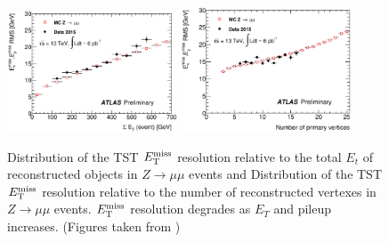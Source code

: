 \begin{figure}[htb]
  \begin{center}
    \includegraphics[width=0.45\textwidth]{figures/METCalib/METReso_Et.eps}\hspace{0.05\textwidth}
    \includegraphics[width=0.45\textwidth]{figures/METCalib/METReso_nVtx.eps}\hspace{0.05\textwidth}
\end{center}
\caption{Distribution of the TST $E_{\mathrm{T}}^{\mathrm{miss}}$ resolution relative to the total $E_t$ of reconstructed objects in $Z\rightarrow \mu\mu$ events and Distribution of the TST $E_{\mathrm{T}}^{\mathrm{miss}}$ resolution relative to the number of reconstructed vertexes in $Z\rightarrow \mu\mu$ events.  $E_{\mathrm{T}}^{\mathrm{miss}}$ resolution degrades as $E_T$ and pileup increases.  (Figures taken from \cite{METReco})}
\label{fig:MET_reso} 
\end{figure}






